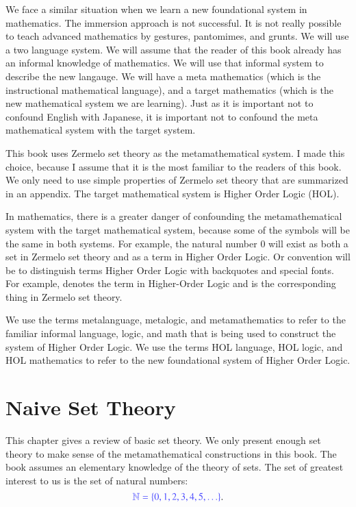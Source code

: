 \documentclass[cup9a]{cupbook}
\begin{document}
We face a similar situation when we learn a new foundational system in mathematics.  The immersion approach is not successful.  It is not really possible to teach advanced mathematics by gestures, pantomimes, and grunts.  We will use a two language system.  We will assume that the reader of this book already has an informal knowledge of mathematics.  We will use that informal system to describe the new langauge.  We will have a meta mathematics (which is the instructional mathematical language), and a target mathematics (which is the new mathematical system we are learning).  
Just as it is important not to confound English with Japanese, it is important not to confound the meta mathematical system with the target system.

This book uses Zermelo set theory as the metamathematical system.  I made this choice, because I assume that it is the most familiar to the readers of this book.  We only need to use simple properties of Zermelo set theory that are summarized in an appendix.  The target mathematical system is Higher Order Logic (HOL).  

In mathematics, there is a greater danger of confounding the metamathematical system with the target mathematical system, because some of the symbols will be the same in both systems.  For example, the natural number $0$ will exist as both a set in Zermelo set theory and as a term in Higher Order Logic.   Or convention will be to distinguish terms Higher Order Logic with backquotes and special fonts.  For example, {\tt {}} denotes the term in Higher-Order Logic and  is the corresponding thing in Zermelo set theory.

We use the terms metalanguage, metalogic, and metamathematics to refer to the familiar informal language, logic, and math that is being used to construct the system of Higher Order Logic.  We use the terms HOL language, HOL logic, and HOL mathematics to refer to the new foundational system of Higher Order Logic. 


\chapter{Naive Set Theory}

This chapter gives a review of basic set theory.  We only present enough set theory to make sense of the metamathematical constructions in this book.
The book assumes an elementary knowledge of the theory of sets.  The set of greatest interest to us is the set of natural numbers:
$$
\mc{\ring{N}=\{0,1,2,3,4,5,\ldots\}}.
$$
\end{document}
